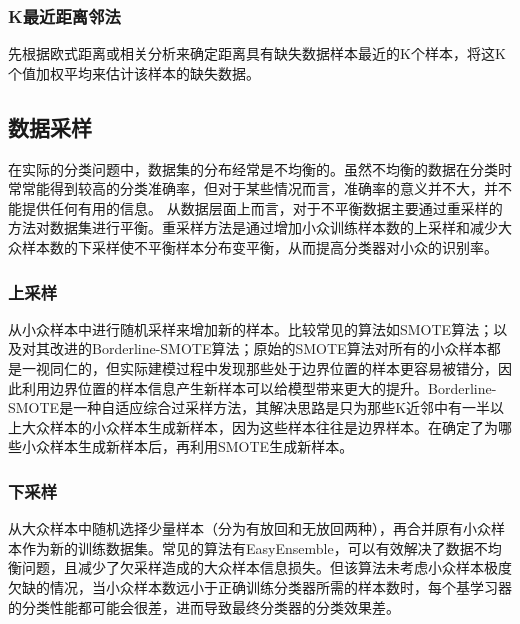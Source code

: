 \documentclass[UTF8]{ctexart}
\begin{document}
\subsubsection{K最近距离邻法}
先根据欧式距离或相关分析来确定距离具有缺失数据样本最近的K个样本，将这K个值加权平均来估计该样本的缺失数据。

\subsection{数据采样}
在实际的分类问题中，数据集的分布经常是不均衡的。虽然不均衡的数据在分类时常常能得到较高的分类准确率，但对于某些情况而言，准确率的意义并不大，并不能提供任何有用的信息。
从数据层面上而言，对于不平衡数据主要通过重采样的方法对数据集进行平衡。重采样方法是通过增加小众训练样本数的上采样和减少大众样本数的下采样使不平衡样本分布变平衡，从而提高分类器对小众的识别率。

\subsubsection{上采样}
从小众样本中进行随机采样来增加新的样本。比较常见的算法如SMOTE算法；以及对其改进的Borderline-SMOTE算法；原始的SMOTE算法对所有的小众样本都是一视同仁的，但实际建模过程中发现那些处于边界位置的样本更容易被错分，因此利用边界位置的样本信息产生新样本可以给模型带来更大的提升。Borderline-SMOTE是一种自适应综合过采样方法，其解决思路是只为那些K近邻中有一半以上大众样本的小众样本生成新样本，因为这些样本往往是边界样本。在确定了为哪些小众样本生成新样本后，再利用SMOTE生成新样本。

\subsubsection{下采样}
从大众样本中随机选择少量样本（分为有放回和无放回两种），再合并原有小众样本作为新的训练数据集。常见的算法有EasyEnsemble，可以有效解决了数据不均衡问题，且减少了欠采样造成的大众样本信息损失。但该算法未考虑小众样本极度欠缺的情况，当小众样本数远小于正确训练分类器所需的样本数时，每个基学习器的分类性能都可能会很差，进而导致最终分类器的分类效果差。
\end{document}
